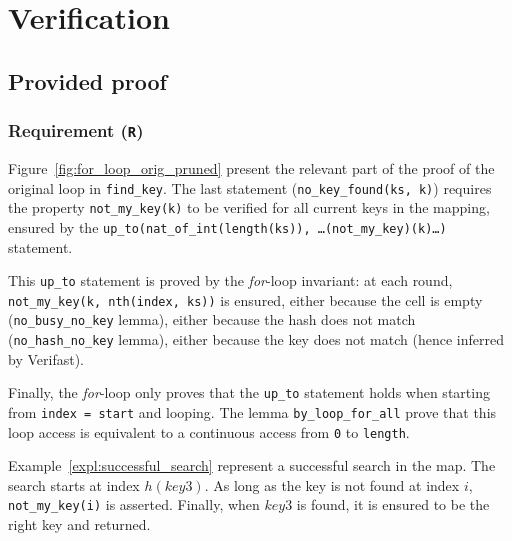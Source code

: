 \documentclass[oneside]{article}
\begin{document}
\section{Verification}

\subsection{Provided proof}
\subsubsection{Requirement (\texttt{R})}
Figure~\ref{fig:for_loop_orig_pruned} present the relevant part of the proof of the original loop in \texttt{find\_key}. The last statement (\texttt{no\_key\_found(ks, k)}) requires the property \texttt{not\_my\_key(k)} to be verified for all current keys in the mapping, ensured by the \texttt{up\_to(nat\_of\_int(length(ks)), \ldots(not\_my\_key)(k)\ldots)} statement.

This \texttt{up\_to} statement is proved by the \emph{for}-loop invariant: at each round, \texttt{not\_my\_key(k, nth(index, ks))} is ensured, either because the cell is empty (\texttt{no\_busy\_no\_key} lemma), either because the hash does not match (\texttt{no\_hash\_no\_key} lemma), either because the key does not match (hence inferred by Verifast). 

Finally, the \emph{for}-loop only proves that the \texttt{up\_to} statement holds when starting from \texttt{index = start} and looping. The lemma \texttt{by\_loop\_for\_all} prove that this loop access is equivalent to a continuous access from \texttt{0} to \texttt{length}.

Example~\ref{expl:successful_search} represent a successful search in the map. The search starts at index $h(key3)$. As long as the key is not found at index $i$, \texttt{not\_my\_key(i)} is asserted. Finally, when $key3$ is found, it is ensured to be the right key and returned. 
\end{document}
